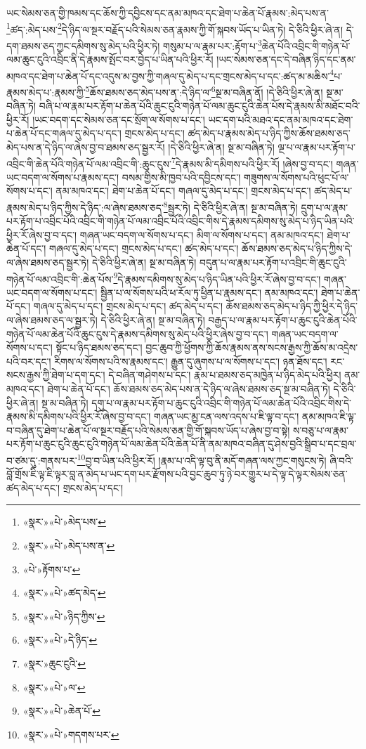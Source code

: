 ཡང་སེམས་ཅན་གྱི་ཁམས་དང་ཆོས་ཀྱི་དབྱིངས་དང་ནམ་མཁའ་དང་ཐེག་པ་ཆེན་པོ་རྣམས་:མེད་པས་ན་\footnote{«སྣར་»«པེ་»མེད་པས་}ཚད་:མེད་པས་\footnote{«སྣར་»«པེ་»མེད་པས་ན་}དེ་ཉིད་ལ་སྔར་བརྗོད་པའི་སེམས་ཅན་རྣམས་ཀྱི་གོ་སྐབས་ཡོད་པ་ཡིན་ཏེ། དེ་ཅིའི་ཕྱིར་ཞེ་ན། དེ་དག་ཐམས་ཅད་ཀྱང་དམིགས་སུ་མེད་པའི་ཕྱིར་ཏེ། གསུམ་པ་ལ་རྣམ་པར་:རྟོག་པ་\footnote{«པེ་»རྟོགས་པ་}ཆེན་པོའི་འབྲིང་གི་གཉེན་པོ་ལམ་ཆུང་ངུའི་འབྲིང་ནི་དེ་རྣམས་སྤོང་བར་བྱེད་པ་ཡིན་པའི་ཕྱིར་རོ། །ཡང་སེམས་ཅན་དང་དེ་བཞིན་ཉིད་དང་ནམ་མཁའ་དང་ཐེག་པ་ཆེན་པོ་དང་འདུས་མ་བྱས་ཀྱི་གཞལ་དུ་མེད་པ་དང་གྲངས་མེད་པ་དང་:ཚད་མ་མཆིས་\footnote{«སྣར་»«པེ་»ཚད་མེད་}པ་རྣམས་མེད་པ་:རྣམས་ཀྱི་\footnote{«སྣར་»«པེ་»ཉིད་ཀྱིས་}ཆོས་ཐམས་ཅད་མེད་པས་ན་:དེ་ཉིད་ལ་\footnote{«སྣར་»«པེ་»དེ་ཉིད་}སྔ་མ་བཞིན་ནོ། །དེ་ཅིའི་ཕྱིར་ཞེ་ན། སྔ་མ་བཞིན་ཏེ། བཞི་པ་ལ་རྣམ་པར་རྟོག་པ་ཆེན་པོའི་ཆུང་ངུའི་གཉེན་པོ་ལམ་ཆུང་ངུའི་ཆེན་པོས་དེ་རྣམས་མི་མཐོང་བའི་ཕྱིར་རོ། །ཡང་བདག་དང་སེམས་ཅན་དང་སྲོག་ལ་སོགས་པ་དང་། ཡང་དག་པའི་མཐའ་དང་ནམ་མཁའ་དང་ཐེག་པ་ཆེན་པོ་དང་གཞལ་དུ་མེད་པ་དང་། གྲངས་མེད་པ་དང་། ཚད་མེད་པ་རྣམས་མེད་པ་ཉིད་ཀྱིས་ཆོས་ཐམས་ཅད་མེད་པས་ན་དེ་ཉིད་ལ་ཞེས་བྱ་བ་ཐམས་ཅད་སྦྱར་རོ། །དེ་ཅིའི་ཕྱིར་ཞེ་ན། སྔ་མ་བཞིན་ཏེ། ལྔ་པ་ལ་རྣམ་པར་རྟོག་པ་འབྲིང་གི་ཆེན་པོའི་གཉེན་པོ་ལམ་འབྲིང་གི་:ཆུང་ངུས་\footnote{«སྣར་»ཆུང་ངུའི་}དེ་རྣམས་མི་དམིགས་པའི་ཕྱིར་རོ། །ཞེས་བྱ་བ་དང་། གཞན་ཡང་བདག་ལ་སོགས་པ་རྣམས་དང་། བསམ་གྱིས་མི་ཁྱབ་པའི་དབྱིངས་དང་། གཟུགས་ལ་སོགས་པའི་ཕུང་པོ་ལ་སོགས་པ་དང་། ནམ་མཁའ་དང་། ཐེག་པ་ཆེན་པོ་དང་། གཞལ་དུ་མེད་པ་དང་། གྲངས་མེད་པ་དང་། ཚད་མེད་པ་རྣམས་མེད་པ་ཉིད་ཀྱིས་དེ་ཉིད་:ལ་ཞེས་ཐམས་ཅད་\footnote{«སྣར་»«པེ་»ལ་}སྦྱར་ཏེ། དེ་ཅིའི་ཕྱིར་ཞེ་ན། སྔ་མ་བཞིན་ཏེ། དྲུག་པ་ལ་རྣམ་པར་རྟོག་པ་འབྲིང་པོའི་འབྲིང་གི་གཉེན་པོ་ལམ་འབྲིང་པོའི་འབྲིང་གིས་དེ་རྣམས་དམིགས་སུ་མེད་པ་ཉིད་ཡིན་པའི་ཕྱིར་རོ་ཞེས་བྱ་བ་དང་། གཞན་ཡང་བདག་ལ་སོགས་པ་དང་། མིག་ལ་སོགས་པ་དང་། ནམ་མཁའ་དང་། ཐེག་པ་ཆེན་པོ་དང་། གཞལ་དུ་མེད་པ་དང་། གྲངས་མེད་པ་དང་། ཚད་མེད་པ་དང་། ཆོས་ཐམས་ཅད་མེད་པ་ཉིད་ཀྱིས་དེ་ལ་ཞེས་ཐམས་ཅད་སྦྱར་ཏེ། དེ་ཅིའི་ཕྱིར་ཞེ་ན། སྔ་མ་བཞིན་ཏེ། བདུན་པ་ལ་རྣམ་པར་རྟོག་པ་འབྲིང་གི་ཆུང་ངུའི་གཉེན་པོ་ལམ་འབྲིང་གི་:ཆེན་པོས་\footnote{«སྣར་»«པེ་»ཆེན་པོ་}དེ་རྣམས་དམིགས་སུ་མེད་པ་ཉིད་ཡིན་པའི་ཕྱིར་རོ་ཞེས་བྱ་བ་དང་། གཞན་ཡང་བདག་ལ་སོགས་པ་དང་། སྦྱིན་པ་ལ་སོགས་པའི་ཕ་རོལ་ཏུ་ཕྱིན་པ་རྣམས་དང་། ནམ་མཁའ་དང་། ཐེག་པ་ཆེན་པོ་དང་། གཞལ་དུ་མེད་པ་དང་། གྲངས་མེད་པ་དང་། ཚད་མེད་པ་དང་། ཆོས་ཐམས་ཅད་མེད་པ་ཉིད་ཀྱི་ཕྱིར་དེ་ཉིད་ལ་ཞེས་ཐམས་ཅད་ལ་སྦྱར་ཏེ། དེ་ཅིའི་ཕྱིར་ཞེ་ན། སྔ་མ་བཞིན་ཏེ། བརྒྱད་པ་ལ་རྣམ་པར་རྟོག་པ་ཆུང་ངུའི་ཆེན་པོའི་གཉེན་པོ་ལམ་ཆེན་པོའི་ཆུང་ངུས་དེ་རྣམས་དམིགས་སུ་མེད་པའི་ཕྱིར་ཞེས་བྱ་བ་དང་། གཞན་ཡང་བདག་ལ་སོགས་པ་དང་། སྟོང་པ་ཉིད་ཐམས་ཅད་དང་། བྱང་ཆུབ་ཀྱི་ཕྱོགས་ཀྱི་ཆོས་རྣམས་ནས་སངས་རྒྱས་ཀྱི་ཆོས་མ་འདྲེས་པའི་བར་དང་། རིགས་ལ་སོགས་པའི་ས་རྣམས་དང་། རྒྱུན་དུ་ཞུགས་པ་ལ་སོགས་པ་དང་། ཉན་ཐོས་དང་། རང་སངས་རྒྱས་ཀྱི་ཐེག་པ་དག་དང་། དེ་བཞིན་གཤེགས་པ་དང་། རྣམ་པ་ཐམས་ཅད་མཁྱེན་པ་ཉིད་མེད་པའི་ཕྱིར། ནམ་མཁའ་དང་། ཐེག་པ་ཆེན་པོ་དང་། ཆོས་ཐམས་ཅད་མེད་པས་ན་དེ་ཉིད་ལ་ཞེས་ཐམས་ཅད་སྔ་མ་བཞིན་ཏེ། དེ་ཅིའི་ཕྱིར་ཞེ་ན། སྔ་མ་བཞིན་ཏེ། དགུ་པ་ལ་རྣམ་པར་རྟོག་པ་ཆུང་ངུའི་འབྲིང་གི་གཉེན་པོ་ལམ་ཆེན་པོའི་འབྲིང་གིས་དེ་རྣམས་མི་དམིགས་པའི་ཕྱིར་རོ་ཞེས་བྱ་བ་དང་། གཞན་ཡང་མྱ་ངན་ལས་འདས་པ་ཇི་ལྟ་བ་དང་། ནམ་མཁའ་ཇི་ལྟ་བ་བཞིན་དུ་ཐེག་པ་ཆེན་པོ་ལ་སྔར་བརྗོད་པའི་སེམས་ཅན་གྱི་གོ་སྐབས་ཡོད་པ་ཞེས་བྱ་བ་སྟེ། ས་བཅུ་པ་ལ་རྣམ་པར་རྟོག་པ་ཆུང་ངུའི་ཆུང་ངུའི་གཉེན་པོ་ལམ་ཆེན་པོའི་ཆེན་པོ་ནི་ནམ་མཁའ་བཞིན་དུ་ཤེས་བྱའི་སྒྲིབ་པ་དང་བྲལ་བ་ཙམ་དུ་:གནས་པར་\footnote{«སྣར་»«པེ་»གདགས་པར་}བྱ་བ་ཡིན་པའི་ཕྱིར་རོ། །རྣམ་པ་འདི་ལྟ་བུ་ནི་མདོ་གཞན་ལས་ཀྱང་གསུངས་ཏེ། ཞི་བའི་བློ་གྲོས་ཇི་ལྟ་ཇི་ལྟར་བླ་ན་མེད་པ་ཡང་དག་པར་རྫོགས་པའི་བྱང་ཆུབ་ཏུ་ཉེ་བར་གྱུར་པ་དེ་ལྟ་དེ་ལྟར་སེམས་ཅན་ཚད་མེད་པ་དང་། གྲངས་མེད་པ་དང་། 